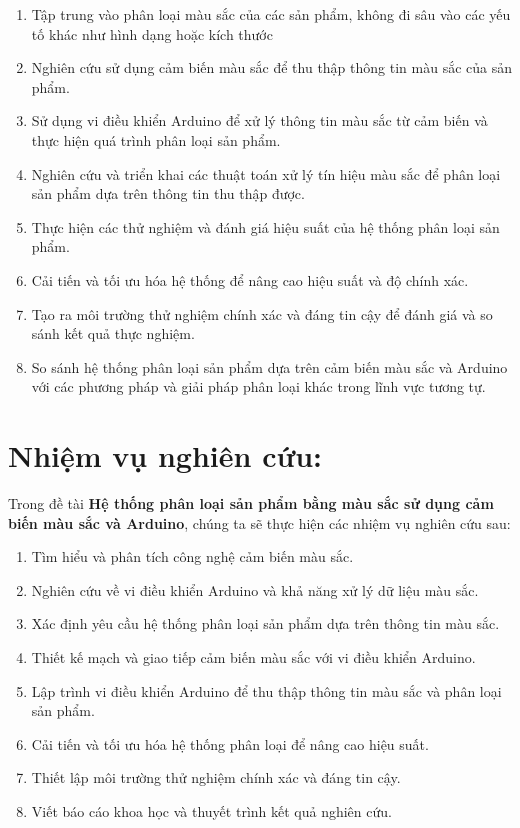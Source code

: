 \documentclass[12pt]{report}
\begin{document}
\begin{enumerate}[itemsep=0pt, parsep=0pt]
    \item Tập trung vào phân loại màu sắc của các sản phẩm, không đi sâu vào các yếu tố khác như hình dạng hoặc kích thước 
    \item Nghiên cứu sử dụng cảm biến màu sắc để thu thập thông tin màu sắc của sản phẩm.
    \item Sử dụng vi điều khiển Arduino để xử lý thông tin màu sắc từ cảm biến và thực hiện quá trình phân loại sản phẩm.
    \item Nghiên cứu và triển khai các thuật toán xử lý tín hiệu màu sắc để phân loại sản phẩm dựa trên thông tin thu thập được.
    \item Thực hiện các thử nghiệm và đánh giá hiệu suất của hệ thống phân loại sản phẩm.
    \item Cải tiến và tối ưu hóa hệ thống để nâng cao hiệu suất và độ chính xác.
    \item Tạo ra môi trường thử nghiệm chính xác và đáng tin cậy để đánh giá và so sánh kết quả thực nghiệm.
    \item So sánh hệ thống phân loại sản phẩm dựa trên cảm biến màu sắc và Arduino với các phương pháp và giải pháp phân loại khác trong lĩnh vực tương tự.
\end{enumerate}
 
\section{Nhiệm vụ nghiên cứu:}
Trong đề tài \textbf{Hệ thống phân loại sản phẩm bằng màu sắc sử dụng cảm biến màu sắc và Arduino}, chúng ta sẽ thực hiện các nhiệm vụ nghiên cứu sau:

\begin{enumerate}[itemsep=0pt, parsep=0pt]
    \item Tìm hiểu và phân tích công nghệ cảm biến màu sắc.
    \item Nghiên cứu về vi điều khiển Arduino và khả năng xử lý dữ liệu màu sắc.
    \item Xác định yêu cầu hệ thống phân loại sản phẩm dựa trên thông tin màu sắc.
    \item Thiết kế mạch và giao tiếp cảm biến màu sắc với vi điều khiển Arduino.
    \item Lập trình vi điều khiển Arduino để thu thập thông tin màu sắc và phân loại sản phẩm.
    \item Cải tiến và tối ưu hóa hệ thống phân loại để nâng cao hiệu suất.
    \item Thiết lập môi trường thử nghiệm chính xác và đáng tin cậy.
    \item Viết báo cáo khoa học và thuyết trình kết quả nghiên cứu.
\end{enumerate}
\end{document}
